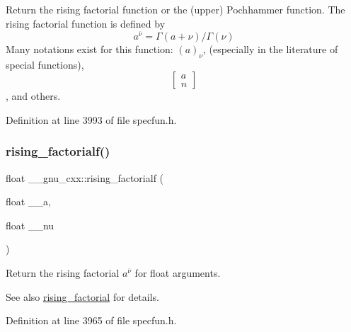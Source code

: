 Return the rising factorial function or the (upper) Pochhammer function. The rising factorial function is defined by \[ a^{\overline{\nu}} = \Gamma(a + \nu) / \Gamma(\nu) \] Many notations exist for this function\+: $ (a)_\nu $, (especially in the literature of special functions), \[ \left[ \begin{array}{c} a \\ n \end{array} \right] \], and others. 



Definition at line 3993 of file specfun.\+h.

\mbox{\label{group__gnu__math__spec__func_ga10da05b995a42f0b0625e61186af7449}} 
\subsubsection{\texorpdfstring{rising\+\_\+factorialf()}{rising\_factorialf()}}
{\footnotesize\ttfamily float \+\_\+\+\_\+gnu\+\_\+cxx\+::rising\+\_\+factorialf (\begin{DoxyParamCaption}\item[{float}]{\+\_\+\+\_\+a,  }\item[{float}]{\+\_\+\+\_\+nu }\end{DoxyParamCaption})\hspace{0.3cm}{\ttfamily [inline]}}

Return the rising factorial $ a^{\overline{\nu}} $ for float arguments.

\begin{DoxySeeAlso}{See also}
\hyperlink{group__gnu__math__spec__func_gae8c36a0e1f60254cf212a3806f7c675c}{rising\+\_\+factorial} for details. 
\end{DoxySeeAlso}


Definition at line 3965 of file specfun.\+h.

\mbox{\label{group__gnu__math__spec__func_gac9a399ae01c315aa78a64b445795d974}} 
